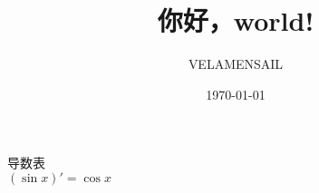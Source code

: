 \documentclass[UTF8]{ctexart}
\title{你好，world!}
\author{VELAMENSAIL}
\date{\today}
\begin{document}
\maketitle
导数表\\
$
{(\sin x)}'=\cos x
$
\end{document}
